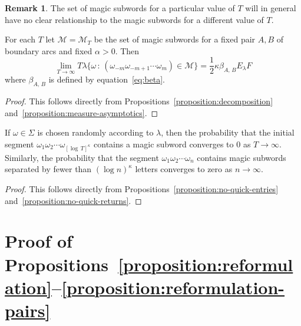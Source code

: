 \documentclass[10pt]{amsart}
\theoremstyle{definition}\newtheorem{defi}[theo]{Definition}\newtheorem{rema}[theo]{Remark}\newtheorem{exam}[theo]{Example}\newtheorem{exem}[theo]{Example}\newtheorem{nota}[theo]{Notation}
\begin{document}
\begin{rema}\label{remark:magicSubwords}
The set of magic subwords for a particular value of $T$ will in general have no clear relationship to the magic subwords for a different value of $T$.
\end{rema}

\begin{prop}\label{proposition:magicWordMeasure}
For each $T$ let $\mathcal{M}=\mathcal{M}_{T}$ be the set of magic subwords for a fixed pair $A,B$ of boundary arcs and fixed $\alpha >0$. Then
\begin{equation}\label{eq:magicWordMeasure}
\lim_{T \rightarrow \infty }T\lambda \{\omega \,:\,(\omega_{-m}\omega_{-m+1}\dotsb \omega_{m})\in \mathcal{M}\}= \frac{1}{2}\kappa \beta_{A,\,B}E_{\lambda}F
\end{equation}
where $\beta_{A,\,B}$ is defined by equation~\eqref{eq:beta}.
\end{prop}

\begin{proof}
This follows directly from Propositions~\ref{proposition:decomposition} and~\ref{proposition:measure-asymptotics}.
\end{proof}



\begin{coro}\label{corollary:quickReturns}
If $\omega \in \Sigma$ is chosen randomly according to $\lambda$, then the probability that the initial segment $\omega_{1}\omega_{2}\dotsb\omega_{[\log\,T]^{\kappa}}$ contains a magic subword converges to $0$ as $T \rightarrow \infty$. Similarly, the probability that the segment $\omega_{1}\omega_{2}\dotsb \omega_{n}$ contains magic subwords separated by fewer than $(\log n)^{\kappa }$ letters converges to zero as $n \rightarrow \infty$.
\end{coro}

\begin{proof}
This follows directly from Propositions~\ref{proposition:no-quick-entries} and~\ref{proposition:no-quick-returns}.
\end{proof}



\section{Proof of Propositions~\ref{proposition:reformulation}--\ref{proposition:reformulation-pairs}}\label{sec:final-step}
\end{document}
